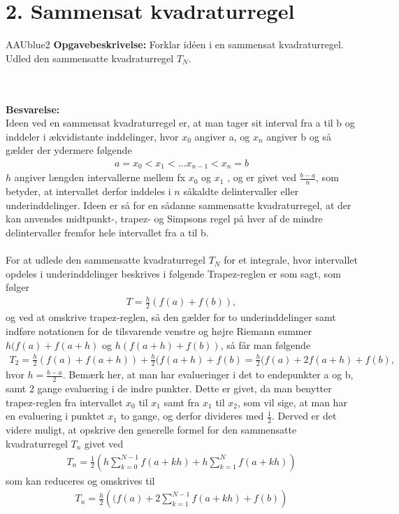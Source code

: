 \section*{2. Sammensat kvadraturregel}
% 
%
\begin{color}{AAUblue2}
%
\textbf{Opgavebeskrivelse:} 
Forklar idéen i en sammensat kvadraturregel. Udled den sammensatte kvadraturregel
$T_N$.
% 
\end{color}
\\\\
% 
\textbf{Besvarelse:} \\
Ideen ved en sammensat kvadraturregel er, at man tager sit interval fra a til b og inddeler i ækvidistante inddelinger, hvor $x_0$ angiver a, og $x_n$ angiver b og så gælder der ydermere følgende
\begin{align*}
a = x_0 < x_1 < … x_{n-1} < x_n = b
\end{align*}
$h$ angiver længden intervallerne mellem fx $x_0$ og $x_1$ , og er givet ved $\frac{b-a}{n}$, som betyder, at intervallet derfor inddeles i $n$ såkaldte delintervaller eller underinddelinger. 
Ideen er så for en sådanne sammensatte kvadraturregel, at der kan anvendes midtpunkt-, trapez- og Simpsons regel på hver af de mindre delintervaller fremfor hele intervallet fra a til b. 
\\\\
For at udlede den sammensatte kvadraturregel $T_N$ for et integrale, hvor intervallet opdeles i underinddelinger beskrives i følgende
Trapez-reglen er som sagt, som følger
\begin{align*}
T = \frac{h}{2}(f(a)+f(b)),
\end{align*}
og ved at omskrive trapez-reglen, så den gælder for to underinddelinger samt indføre notationen for de tilsvarende venstre og højre Riemann summer $h(f(a)+f(a+h)$ og $h(f(a+h)+f(b))$, så får man følgende 
\begin{align*}
T_2=\frac{h}{2}(f(a)+f(a+h))+\frac{h}{2}(f(a+h)+f(b)= \frac{h}{2}(f(a)+2f(a+h)+f(b),
\end{align*}
hvor $h=\frac{b-a}{2}$. Bemærk her, at man har evalueringer i det to endepunkter a og b, samt 2 gange evaluering i de indre punkter. Dette er givet, da man benytter trapez-reglen fra intervallet $x_0$ til $x_1$ samt fra $x_1$ til $x_2$, som vil sige, at man har en evaluering i punktet $x_1$ to gange, og derfor divideres med $\frac{1}{2}$. Derved er det videre muligt, at opskrive den generelle formel for den sammensatte kvadraturregel $T_n$ givet ved
\begin{align*}
T_n = \frac{1}{2}\left (  h\sum_{k=0}^{N-1}f(a+kh)+h\sum_{k=1}^{N}f(a+kh)\right )
\end{align*}
som kan reduceres og omskrives til 
\begin{align*}
T_n =\frac{h}{2}\left ((f(a)+2\sum_{k=1}^{N-1}f(a+kh)+f(b) \right )
\end{align*}
%